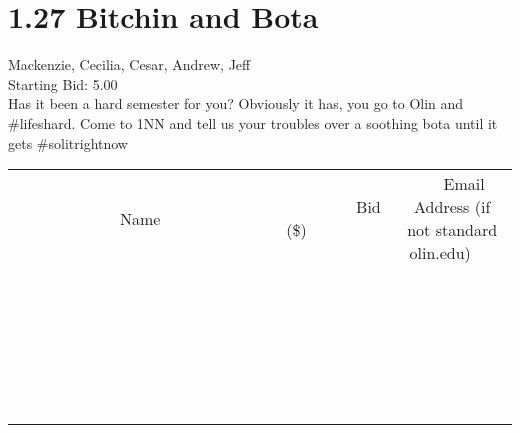 \documentclass[11pt]{article}
\begin{document}
					\section*{1.27 Bitchin and Bota}
					Mackenzie, Cecilia, Cesar, Andrew, Jeff \\
					Starting Bid: 5.00 \\
					Has it been a hard semester for you? Obviously it has, you go to Olin and \#lifeshard. Come to 1NN and tell us your troubles over a soothing bota until it gets \#solitrightnow \\
					[6ex]
					\begin{tabular}{c c c}
						~~~~~~~~~~~~~Name~~~~~~~~~~~~~ & ~~~~~~~~~Bid (\$)~~~~~~~~~ & ~~~Email Address (if not standard olin.edu)~~~ \\
				
 & & \\
\hline
 & & \\
\hline
 & & \\
\hline
 & & \\
\hline
 & & \\
\hline
 & & \\
\hline
 & & \\
\hline
 & & \\
\hline
 & & \\
\hline
 & & \\
\hline
 & & \\
\hline
 & & \\
\hline
 & & \\
\hline
 & & \\
\hline
 & & \\
\hline
 & & \\
\hline
 & & \\
\hline
 & & \\
\hline
 & & \\
\hline
 & & \\
\hline
 & & \\
\hline
 & & \\
\hline
 & & \\
\hline
 & & \\
\hline
 & & \\
\hline
 & & \\
\hline
					\end{tabular}
					\clearpage
				
\end{document}
